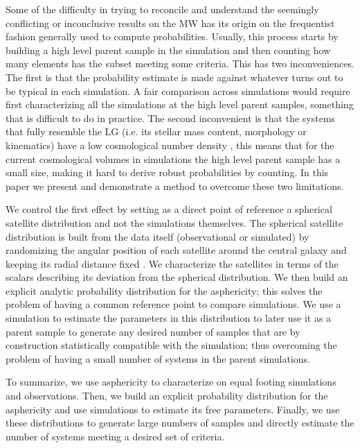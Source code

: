 \documentclass[a4paper,fleqn,usenatbib]{mnras}
\begin{document}
Some of the difficulty in trying to reconcile and understand the
seemingly conflicting or inconclusive results on the MW has its origin on
the frequentist fashion generally used to compute probabilities.
Usually, this process starts by building a high level parent sample in the
simulation and then counting how many elements has the subset
meeting some criteria. 
This has two inconveniences.
The first is that the probability estimate is made against whatever
turns out to be typical in each simulation. 
A fair comparison across simulations would require first
characterizing all the simulations at the high level parent samples,
something that is difficult to do in practice. 
The second inconvenient is that the systems that fully resemble
the LG (i.e. its stellar mass content, morphology or kinematics) have
a low cosmological number density \citep{ForeroRomero2013}, this means
that for the current cosmological volumes in simulations the high
level parent sample has a small size, making it hard to derive robust
probabilities by counting.    
In this paper we present and demonstrate a method to overcome these two
limitations.

We control the first effect by setting as a direct point of reference
a spherical satellite distribution and not the simulations themselves.
The spherical satellite distribution is built from the data itself
(observational or simulated) by randomizing the angular position
of each satellite around the central galaxy and keeping its radial
distance fixed \citep{2017AN....338..854P}. 
We characterize the satellites in terms of the scalars describing its
deviation from the spherical distribution. 
We then build an explicit analytic probability distribution for the
asphericity; this solves the problem of having a common reference
point to compare simulations.  
We use a simulation to estimate the parameters in this distribution to
later use it as a parent sample to generate any desired number of
samples that are by construction statistically compatible with the
simulation; thus overcoming the problem of having a small number of
systems in the parent simulations. 

To summarize, we use asphericity to characterize on equal footing
simulations and observations.  
Then, we build an explicit probability distribution for the asphericity and
use simulations to estimate its free parameters.
Finally, we use these distributions to generate large numbers of
samples and directly estimate the number of systems meeting a desired
set of criteria.
\end{document}
